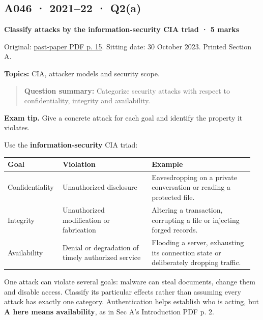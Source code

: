 \documentclass[11pt,a4paper]{article}
\begin{document}
\clearpage
\subsection{A046 · 2021–22 · Q2(a)}\label{a046}

\textbf{Classify attacks by the information-security CIA triad · 5 marks}


Original: \href{../../CSE405-Security_Merged.pdf\#page=15}{past-paper PDF p. 15}. Sitting date: 30 October 2023. Printed Section A.


\textbf{Topics:} CIA,\allowbreak{} attacker models and security scope.



\begin{quote}\small

\textbf{Question summary:} Categorize security attacks with respect to confidentiality,\allowbreak{} integrity and availability.



\end{quote}


{\color{ForestGreen}\textbf{Exam tip.} Give a concrete attack for each goal and identify the property it violates.}


Use the \textbf{information-security} CIA triad:



{\small\setlength{\tabcolsep}{3pt}
\begin{longtable}{>{\raggedright\arraybackslash}p{0.19530\linewidth}>{\raggedright\arraybackslash}p{0.35657\linewidth}>{\raggedright\arraybackslash}p{0.40655\linewidth}}
\toprule
\textbf{Goal} & \textbf{Violation} & \textbf{Example} \\
\midrule
\endhead
Confidentiality & Unauthorized disclosure & Eavesdropping on a private conversation or reading a protected file. \\
Integrity & Unauthorized modification or fabrication & Altering a transaction,\allowbreak{} corrupting a file or injecting forged records. \\
Availability & Denial or degradation of timely authorized service & Flooding a server,\allowbreak{} exhausting its connection state or deliberately dropping traffic. \\
\bottomrule
\end{longtable}
}

One attack can violate several goals: malware can steal documents,\allowbreak{} change them and disable access. Classify its particular effects rather than assuming every attack has exactly one category. Authentication helps establish who is acting,\allowbreak{} but \textbf{A here means availability},\allowbreak{} as in Sec A's Introduction PDF p. 2.
\end{document}

